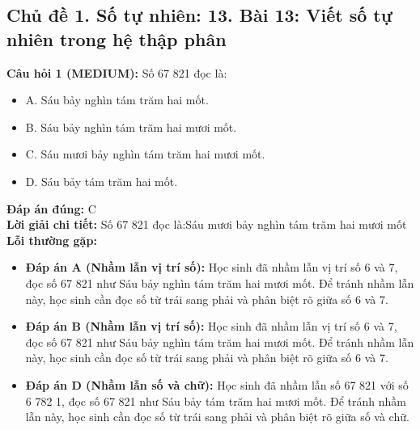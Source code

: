 \documentclass{article}
\begin{document}
\subsection{Chủ đề 1. Số tự nhiên: 13. Bài 13: Viết số tự nhiên trong hệ thập phân}
\begin{minipage}{\textwidth}
\noindent\textbf{Câu hỏi 1 (MEDIUM):} Số 67 821 đọc là: 
\begin{itemize}[label={}]
    \item A. Sáu bảy nghìn tám trăm hai mốt.
    \item B. Sáu bảy nghìn tám trăm hai mươi mốt.
    \item C. Sáu mươi bảy nghìn tám trăm hai mươi mốt.
    \item D. Sáu bảy tám trăm hai mốt.
\end{itemize}
\textbf{Đáp án đúng:} C \\
\textbf{Lời giải chi tiết:} Số 67 821 đọc là:Sáu mươi bảy nghìn tám trăm hai mươi mốt \\
\textbf{Lỗi thường gặp:}
\begin{itemize}
  \item \textbf{Đáp án A (Nhầm lẫn vị trí số):} Học sinh đã nhầm lẫn vị trí số 6 và 7, đọc số 67 821 như Sáu bảy nghìn tám trăm hai mươi mốt. Để tránh nhầm lẫn này, học sinh cần đọc số từ trái sang phải và phân biệt rõ giữa số 6 và 7.
  \item \textbf{Đáp án B (Nhầm lẫn vị trí số):} Học sinh đã nhầm lẫn vị trí số 6 và 7, đọc số 67 821 như Sáu bảy nghìn tám trăm hai mươi mốt. Để tránh nhầm lẫn này, học sinh cần đọc số từ trái sang phải và phân biệt rõ giữa số 6 và 7.
  \item \textbf{Đáp án D (Nhầm lẫn số và chữ):} Học sinh đã nhầm lẫn số 67 821 với số 6 782 1, đọc số 67 821 như Sáu bảy tám trăm hai mươi mốt. Để tránh nhầm lẫn này, học sinh cần đọc số từ trái sang phải và phân biệt rõ giữa số và chữ.
\end{itemize}
\end{minipage}
\vspace{1em}
\end{document}
